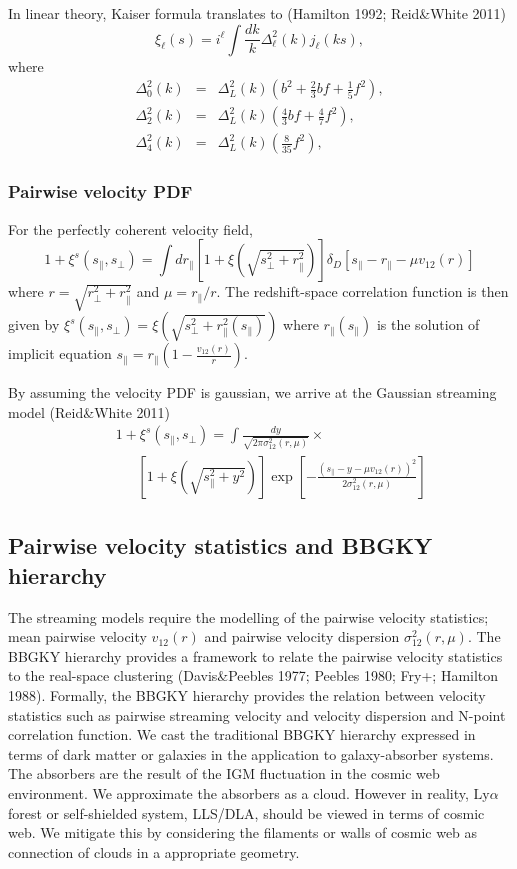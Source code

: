 \documentclass[useAMS,usenatbib,twocolumn]{mn2e}
\newcommand{\LyA}{\mbox{Ly}\alpha}
\begin{document}
In linear theory, Kaiser formula translates to (Hamilton 1992; Reid\&White 2011)
\begin{equation}
\xi_\ell(s)=i^\ell\int\frac{dk}{k}\Delta^2_\ell(k)j_\ell(ks),
\end{equation}
where 
\begin{eqnarray}
\Delta^2_0(k)&=&\Delta^2_{L}(k)(b^2+\frac{2}{3}bf+\frac{1}{5}f^2), \\
\Delta^2_2(k)&=&\Delta^2_{L}(k)(\frac{4}{3}bf+\frac{4}{7}f^2), \\
\Delta^2_4(k)&=&\Delta^2_{L}(k)(\frac{8}{35}f^2),
\end{eqnarray}


\subsubsection{Pairwise velocity PDF}
For the perfectly coherent velocity field, 
\begin{equation}
1+\xi^s(s_\parallel,s_\perp)=\int dr_\parallel
\left[1+\xi(\sqrt{s^2_\perp+r_\parallel^2})\right]
\delta_D\left[s_\parallel-r_\parallel-\mu v_{12}(r)\right]
\end{equation}
where $r=\sqrt{r_\perp^2+r_\parallel^2}$ and $\mu=r_\parallel/r$. 
The redshift-space correlation function is then given by
$\xi^s(s_\parallel,s_\perp)=\xi(\sqrt{s^2_\perp+r_\parallel^2(s_\parallel)})$
where $r_\parallel(s_\parallel)$ is the solution of implicit equation
$s_\parallel=r_\parallel\left(1-\frac{v_{12}(r)}
{r}\right)$.

By assuming the velocity PDF is gaussian,
we arrive at the Gaussian streaming model (Reid\&White 2011)
\begin{eqnarray}
&&1+\xi^s(s_\parallel,s_\perp)=\int \frac{dy}{\sqrt{2\pi\sigma_{12}^2(r,\mu)}}\times
 \\
&&~~~~~~~\left[1+\xi(\sqrt{s^2_\parallel+y^2})\right]
\exp\left[-\frac{(s_\parallel-y-\mu v_{12}(r))^2}{2\sigma^2_{12}(r,\mu)}\right]
\nonumber
\end{eqnarray}


\subsection{Pairwise velocity statistics and BBGKY hierarchy}
The streaming models require the modelling of the pairwise velocity statistics;
mean pairwise velocity $v_{12}(r)$ and pairwise velocity dispersion 
$\sigma_{12}^2(r,\mu)$. The BBGKY hierarchy provides a framework to relate the 
pairwise velocity statistics to the real-space clustering (Davis\&Peebles 1977;
Peebles 1980; Fry+; Hamilton 1988). Formally, the BBGKY hierarchy provides the
relation between velocity statistics such as pairwise streaming velocity
and velocity dispersion and N-point correlation function. 
We cast the traditional BBGKY hierarchy expressed in terms of dark matter or 
galaxies in the application to galaxy-absorber systems. The absorbers are the 
result of the IGM fluctuation in the cosmic web environment. 
We approximate the absorbers as a cloud. 
However in reality, $\LyA$ forest or self-shielded system, LLS/DLA, should be
viewed in terms of cosmic web. We mitigate this by considering the filaments or
walls of cosmic web as connection of clouds in a appropriate geometry. 
\end{document}

